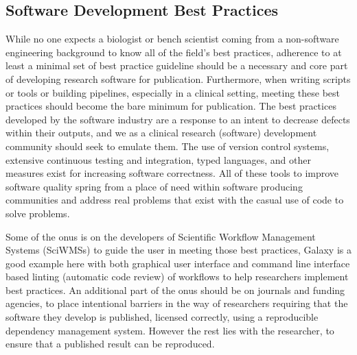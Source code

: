 \subsection{Software Development Best Practices}

While no one expects a biologist or bench scientist coming from a non-software engineering background to know all of the field's best practices, adherence to at least a minimal set of best practice guideline should be a necessary and core part of developing research software for publication.
Furthermore, when writing scripts or tools or building pipelines, especially in a clinical setting, meeting these best practices should become the bare minimum for publication.
The best practices developed by the software industry are a response to an intent to decrease defects within their outputs, and we as a clinical research (software) development community should seek to emulate them.
The use of version control systems, extensive continuous testing and integration, typed languages, and other measures exist for increasing software correctness. All of these tools to improve software quality spring from a place of need within software producing communities and address real problems that exist with the casual use of code to solve problems.

Some of the onus is on the developers of Scientific Workflow Management Systems (SciWMSs) to guide the user in meeting those best practices, Galaxy is a good example here with both graphical user interface and command line interface based linting (automatic code review) of workflows to help researchers implement best practices. An additional part of the onus should be on journals and funding agencies, to place intentional barriers in the way of researchers requiring that the software they develop is published, licensed correctly, using a reproducible dependency management system. However the rest lies with the researcher, to ensure that a published result can be reproduced.


